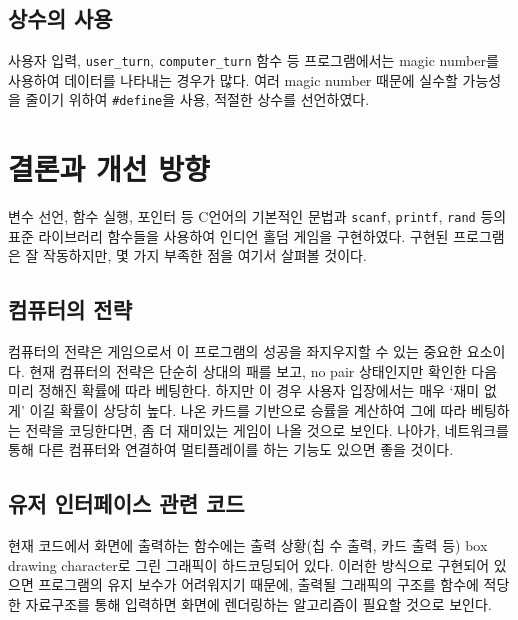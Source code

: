 \documentclass[titlepage]{article}
\begin{document}
\subsection{상수의 사용}

사용자 입력, \texttt{user\_turn}, \texttt{computer\_turn} 함수 등 프로그램에서는 magic number를 사용하여 데이터를 나타내는 경우가 많다. 여러 magic number 때문에 실수할 가능성을 줄이기 위하여 \texttt{\#define}을 사용, 적절한 상수를 선언하였다.

\section{결론과 개선 방향}

변수 선언, 함수 실행, 포인터 등 C언어의 기본적인 문법과 \texttt{scanf}, \texttt{printf}, \texttt{rand} 등의 표준 라이브러리 함수들을 사용하여 인디언 홀덤 게임을 구현하였다. 구현된 프로그램은 잘 작동하지만, 몇 가지 부족한 점을 여기서 살펴볼 것이다.

\subsection{컴퓨터의 전략}

컴퓨터의 전략은 게임으로서 이 프로그램의 성공을 좌지우지할 수 있는 중요한 요소이다. 현재 컴퓨터의 전략은 단순히 상대의 패를 보고, no pair 상태인지만 확인한 다음 미리 정해진 확률에 따라 베팅한다. 하지만 이 경우 사용자 입장에서는 매우 `재미 없게' 이길 확률이 상당히 높다. 나온 카드를 기반으로 승률을 계산하여 그에 따라 베팅하는 전략을 코딩한다면, 좀 더 재미있는 게임이 나올 것으로 보인다. 나아가, 네트워크를 통해 다른 컴퓨터와 연결하여 멀티플레이를 하는 기능도 있으면 좋을 것이다.

\subsection{유저 인터페이스 관련 코드}

현재 코드에서 화면에 출력하는 함수에는 출력 상황(칩 수 출력, 카드 출력 등) box drawing character로 그린 그래픽이 하드코딩되어 있다. 이러한 방식으로 구현되어 있으면 프로그램의 유지 보수가 어려워지기 때문에, 출력될 그래픽의 구조를 함수에 적당한 자료구조를 통해 입력하면 화면에 렌더링하는 알고리즘이 필요할 것으로 보인다.
\end{document}
